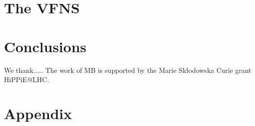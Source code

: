 \documentclass[a4paper,10pt]{article}
\begin{document}
\section{The VFNS}













\section{Conclusions}
\label{sec:conclusions}












\acknowledgments
{
We thank.....
%
The work of MB is supported by the Marie Sk\l{}odowska Curie grant HiPPiE@LHC.
}




\appendix
\section{\boldmath Appendix}
\label{sec:app}








{}



\end{document}
